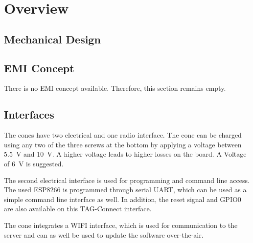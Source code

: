 \section{Overview}
\lipsum

\subsection{Mechanical Design}

\FloatBarrier
\subsection{EMI Concept}
There is no EMI concept available. Therefore, this section remains empty. 

\FloatBarrier
\subsection{Interfaces}
The cones have two electrical and one radio interface. The cone can be charged using any two of the three screws at the bottom by applying a voltage between \qty{5.5}{\V} and \qty{10}{\V}. A higher voltage leads to higher losses on the board. A Voltage of \qty{6}{\V} is suggested. 

The second electrical interface is used for programming and command line access. The used ESP8266 is programmed through serial UART, which can be used as a simple command line interface as well. In addition, the reset signal and GPIO0 are also available on this TAG-Connect interface. 

The cone integrates a WIFI interface, which is used for communication to the server and can as well be used to update the software over-the-air. 

